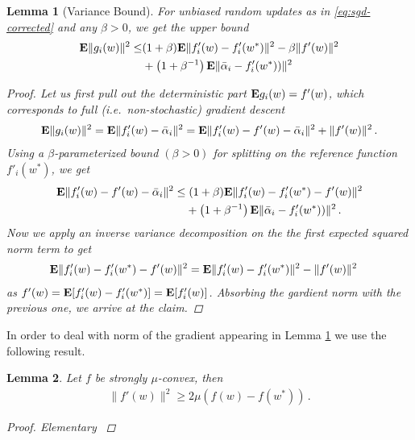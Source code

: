 \documentclass{article}
\newtheorem{lemma}{Lemma}
\newcommand{\E}{{\bf E}}
\begin{document}
\begin{lemma}[Variance Bound]
For unbiased random updates as in \eqref{eq:sgd-corrected} and any $\beta>0$, we get the upper bound 
\begin{align}
\E \|g_i(w)\|^2 \le 
& (1+\beta) \E \| f'_i(w) - f'_i(w^*) \|^2  - \beta \| f'(w) \|^2 \nonumber \\
& + \left(1+ \beta^{-1} \right) \E \| \bar \alpha_i - f_i'(w^*) )\|^2
\end{align}

\begin{proof} 
Let us first pull out the deterministic part $\E g_i(w) = f'(w)$, which corresponds to full (i.e.~non-stochastic) gradient descent 
\begin{align}
\E \|g_i(w)\|^2 = \E \| f'_i(w) - \bar \alpha_i  \|^2  = \E \| f'_i(w) - f'(w) - \bar \alpha_i  \|^2 + \| f'(w)\|^2 \,.
\end{align}
Using a $\beta$-parameterized bound $(\beta >0)$ for splitting on the reference function $f'_i(w^*)$, we get
\begin{align}
 \E \| f'_i(w) - f'(w) - \bar \alpha_i  \|^2  \leq & \; (1+\beta) \E \| f'_i(w) - f'_i(w^*) - f'(w) \|^2 \\
& + \left(1+ \beta^{-1} \right) \E \| \bar \alpha_i - f_i'(w^*) )\|^2 \,.
\nonumber
\end{align} 
Now we apply an inverse variance decomposition on the the first expected squared norm term to get
\begin{align}
&  \E \| f'_i(w) - f'_i(w^*) - f'(w) \|^2  =   \E \| f'_i(w) - f'_i(w^*)  \|^2 -  \| f'(w)\|^2
\end{align}
as $f'(w) = \E[f'_i(w) - f'_i(w^*)]= \E[f'_i(w)] $. Absorbing the gardient norm with the previous one, we arrive at the claim.
\end{proof} 
\label{lemma:var-bound}
\end{lemma}

In order to deal with norm of the gradient appearing in Lemma \ref{lemma:var-bound} we use the following result. 
\begin{lemma}
Let $f$ be strongly $\mu$-convex, then 
\begin{align}
\| f'(w) \|^2 \ge 2 \mu \left( f(w) - f(w^*) \right) \,.
\label{eq:gradient-norm-bound} 
\end{align} 
\begin{proof} 
Elementary \cite{}
\end{proof}
\label{lemma:gradient-norm-bound} 
\end{lemma} 
\end{document}
